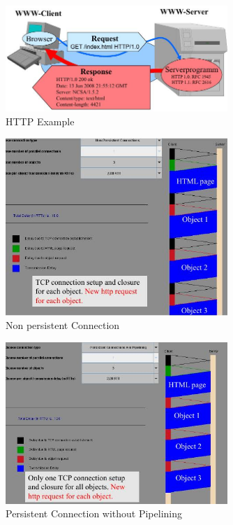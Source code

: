 \documentclass[ngerman,a4paper,12pt]{scrreprt}
\begin{document}
\begin{figure}[H]
	\centering
	\includegraphics[width=0.75\textwidth]{img/V14.7.jpg}
	\caption{HTTP Example}
	\label{}
\end{figure}

\begin{figure}[H]
	\centering
	\includegraphics[width=0.75\textwidth]{img/V14.15.jpg}
	\caption{Non persistent Connection}
	\label{}
\end{figure}

\begin{figure}[H]
	\centering
	\includegraphics[width=0.75\textwidth]{img/V14.16.jpg}
	\caption{Persistent Connection without Pipelining}
	\label{}
\end{figure}
\end{document}
